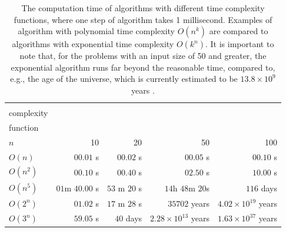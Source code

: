 \begin{table}[ht]
\footnotesize
\begin{tabular}{|l|r|r|r|r|}
\hline
\diagbox[height=43pt,width=125pt]{time\\complexity\\function}{input size \\ $n$} & 10          & 20        & 50             & 100            \\ \hline
$O(n)$                                                                           & $00.01$ s     & $00.02$ s   & $00.05$ s        & $00.10$ s        \\ \hline
$O(n^2)$                                                                         & $00.10$ s     & $00.40$ s   & $02.50$ s        & $10.00$ s        \\ \hline
$O(n^5)$                                                                         & $01$m $40.00$ s & $53$ m $20$ s & $14$h $48$m $20$s    & $116$ days       \\ \hline
$O(2^n)$                                                                         & $01.02$ s     & $17$ m $28$ s & $35702$ years    & $4.02\times 10^{19}$ years \\ \hline
$O(3^n)$                                                                         & $59.05$ s     & $40$ days   & $2.28\times 10^{13}$ years & $1.63\times 10^{37}$ years \\ \hline
\end{tabular}
\caption{The computation time of algorithms with different time complexity functions, where one step of algorithm takes 1 millisecond. Examples of algorithm with polynomial time complexity $O(n^k)$ are compared to algorithms with exponential time complexity $O(k^n)$. It is important to note that, for the problems with an input size of 50 and greater, the exponential algorithm runs far beyond the reasonable time, compared to, e.g., the age of the universe, which is currently estimated to be $13.8\times 10^9$ years \cite{PlanckCollaboration2013}.}
\label{table:timecomplexity}
\end{table}

